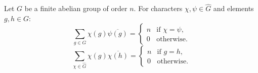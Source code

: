 Let $G$ be a finite abelian group of order $n$. For characters $\chi, \psi \in \widehat{G}$ and elements $g, h \in G$:
$$\sum_{g \in G} \chi(g) \overline{\psi(g)} = \begin{cases} n & \text{if } \chi = \psi, \\ 0 & \text{otherwise.} \end{cases}$$
$$\sum_{\chi \in \widehat{G}} \chi(g) \overline{\chi(h)} = \begin{cases} n & \text{if } g = h, \\ 0 & \text{otherwise.} \end{cases}$$
